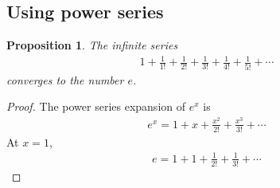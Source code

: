\documentclass[12pt]{article}
\newtheorem{prop}[thm]{Proposition}
\begin{document}
\subsection{Using power series}

\begin{prop} The infinite series
\begin{align}
1 + \frac{1}{1!}+\frac{1}{2!}+\frac{1}{3!}+\frac{1}{4!}+\frac{1}{5!}+\cdots
\end{align}
converges to the number $e$.
\end{prop}

\begin{proof}
The power series expansion of $e^x$ is
\begin{align}
e^x=1+x+\frac{x^2}{2!}+\frac{x^3}{3!}+\cdots
\end{align}
At $x=1$,
\begin{align}
e=1+1+\frac{1}{2!}+\frac{1}{3!}+\cdots
\end{align}
\end{proof}
\end{document}
